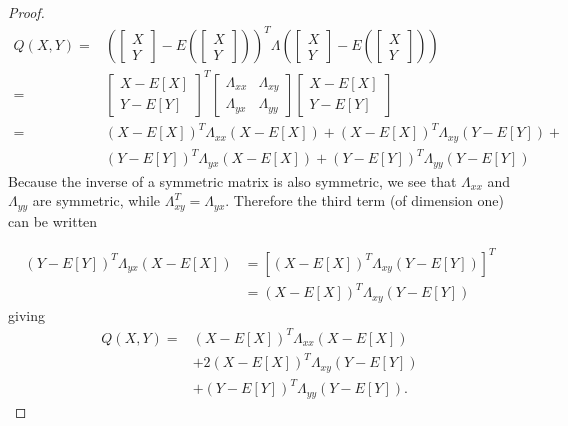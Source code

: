 \documentclass{article}
\theoremstyle{definition}
\theoremstyle{remark}
\begin{document}
\begin{proof}
\begin{align*}
Q(X,Y)=&\left(\begin{bmatrix} X\\ Y \end{bmatrix}-E\left( \begin{bmatrix} X\\ Y \end{bmatrix} \right)\right)^T
\Lambda
\left(\begin{bmatrix} X\\ Y \end{bmatrix}-E\left( \begin{bmatrix} X\\ Y \end{bmatrix} \right)\right)\\
%
=&\begin{bmatrix} X-E[X]\\ Y-E[Y] \end{bmatrix}^T%
\begin{bmatrix} \Lambda_{xx} & \Lambda_{xy}\\ \Lambda_{yx} & \Lambda_{yy} \end{bmatrix}
\begin{bmatrix} X-E[X]\\ Y-E[Y] \end{bmatrix}\\
%
%
=&(X-E[X])^T\Lambda_{xx}(X-E[X])+(X-E[X])^T\Lambda_{xy}(Y-E[Y])+\\
&(Y-E[Y])^T\Lambda_{yx}(X-E[X])+(Y-E[Y])^T\Lambda_{yy}(Y-E[Y])
\end{align*}
Because the inverse of a symmetric matrix is also symmetric, we see that $\Lambda_{xx}$ and $\Lambda_{yy}$ are symmetric, while $\Lambda_{xy}^T=\Lambda_{yx}$. Therefore the third term (of dimension one) can be written

\begin{align*}
(Y-E[Y])^T\Lambda_{yx}(X-E[X])&=\left[ (X-E[X])^T\Lambda_{xy}(Y-E[Y]) \right]^T\\
&=(X-E[X])^T\Lambda_{xy}(Y-E[Y])
\end{align*}
giving
\begin{align*}
Q(X,Y)=&(X-E[X])^T\Lambda_{xx}(X-E[X])\\
&+2(X-E[X])^T\Lambda_{xy}(Y-E[Y])\\
&+(Y-E[Y])^T\Lambda_{yy}(Y-E[Y]).
\end{align*}


\end{proof}
\end{document}
